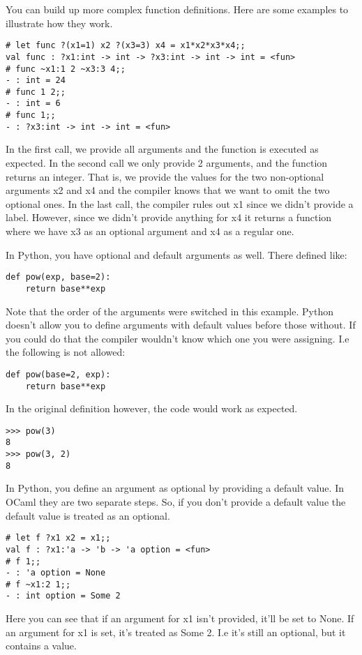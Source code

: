 \documentclass{article}
\begin{document}
You can build up more complex function definitions.
Here are some examples to illustrate how they work.

\begin{verbatim}
# let func ?(x1=1) x2 ?(x3=3) x4 = x1*x2*x3*x4;;
val func : ?x1:int -> int -> ?x3:int -> int -> int = <fun>
# func ~x1:1 2 ~x3:3 4;;
- : int = 24
# func 1 2;;
- : int = 6
# func 1;;
- : ?x3:int -> int -> int = <fun>
\end{verbatim}

In the first call, we provide all arguments and the function is executed as expected.
In the second call we only provide 2 arguments, and the function returns an integer.
That is, we provide the values for the two non-optional arguments x2 and x4 and the compiler knows that we want to omit the two optional ones.
In the last call, the compiler rules out x1 since we didn't provide a label.
However, since we didn't provide anything for x4 it returns a function where we have x3 as an optional argument and x4 as a regular one.

In Python, you have optional and default arguments as well.
There defined like:
\begin{verbatim}
def pow(exp, base=2):
    return base**exp
\end{verbatim}

Note that the order of the arguments were switched in this example.
Python doesn't allow you to define arguments with default values before those without.
If you could do that the compiler wouldn't know which one you were assigning.
I.e the following is not allowed:
\begin{verbatim}
def pow(base=2, exp):
    return base**exp
\end{verbatim}

In the original definition however, the code would work as expected.
\begin{verbatim}
>>> pow(3)
8
>>> pow(3, 2)
8
\end{verbatim}

In Python, you define an argument as optional by providing a default value.
In OCaml they are two separate steps.
So, if you don't provide a default value the default value is treated as an optional.
\begin{verbatim}
# let f ?x1 x2 = x1;;
val f : ?x1:'a -> 'b -> 'a option = <fun>
# f 1;;
- : 'a option = None
# f ~x1:2 1;;
- : int option = Some 2
\end{verbatim}

Here you can see that if an argument for x1 isn't provided, it'll be set to None.
If an argument for x1 is set, it's treated as Some 2.
I.e it's still an optional, but it contains a value.
\end{document}

